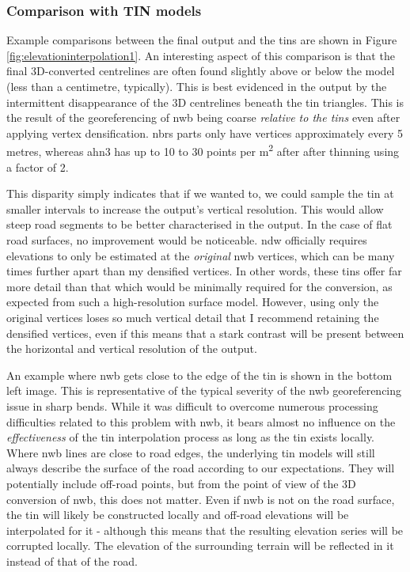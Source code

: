 \subsubsection{Comparison with TIN models}

Example comparisons between the final output and the \ac{tin}s are shown in Figure \ref{fig:elevationinterpolation1}. An interesting aspect of this comparison is that the final 3D-converted centrelines are often found slightly above or below the model (less than a centimetre, typically). This is best evidenced in the output by the intermittent disappearance of the 3D centrelines beneath the \ac{tin} triangles. This is the result of the georeferencing of \ac{nwb} being coarse \textit{relative to the \ac{tin}s} even after applying vertex densification. \ac{nbrs} parts only have vertices approximately every 5 metres, whereas \ac{ahn3} has up to 10 to 30 points per m\textsuperscript{2} after after thinning using a factor of 2.

This disparity simply indicates that if we wanted to, we could sample the \ac{tin} at smaller intervals to increase the output's vertical resolution. This would allow steep road segments to be better characterised in the output. In the case of flat road surfaces, no improvement would be noticeable. \ac{ndw} officially requires elevations to only be estimated at the \textit{original} \ac{nwb} vertices, which can be many times further apart than my densified vertices. In other words, these \ac{tin}s offer far more detail than that which would be minimally required for the conversion, as expected from such a high-resolution surface model. However, using only the original vertices loses so much vertical detail that I recommend retaining the densified vertices, even if this means that a stark contrast will be present between the horizontal and vertical resolution of the output.

An example where \ac{nwb} gets close to the edge of the \ac{tin} is shown in the bottom left image. This is representative of the typical severity of the \ac{nwb} georeferencing issue in sharp bends. While it was difficult to overcome numerous processing difficulties related to this problem with \ac{nwb}, it bears almost no influence on the \textit{effectiveness} of the \ac{tin} interpolation process as long as the \ac{tin} exists locally. Where \ac{nwb} lines are close to road edges, the underlying \ac{tin} models will still always describe the surface of the road according to our expectations. They will potentially include off-road points, but from the point of view of the 3D conversion of \ac{nwb}, this does not matter. Even if \ac{nwb} is not on the road surface, the \ac{tin} will likely be constructed locally and off-road elevations will be interpolated for it - although this means that the resulting elevation series will be corrupted locally. The elevation of the surrounding terrain will be reflected in it instead of that of the road.

